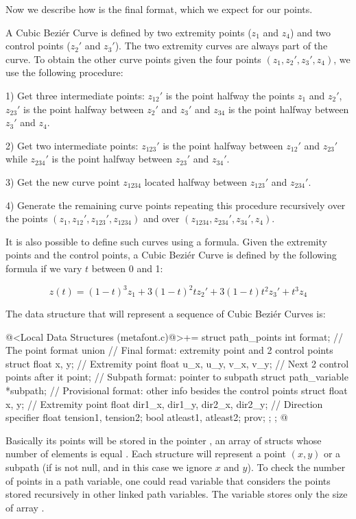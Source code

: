 Now we describe how is the final format, which we expect for our
points.

A Cubic Beziér Curve is defined by two extremity points ($z_1$ and
$z_4$) and two control points ($z_2'$ and $z_3'$). The two extremity
curves are always part of the curve. To obtain the other curve points
given the four points $(z_1, z_2', z_3', z_4)$, we use the following
procedure:

1) Get three intermediate points: $z_{12}'$ is the point halfway the
points $z_1$ and $z_2'$, $z_{23}'$ is the point halfway between $z_2'$
and $z_3'$ and $z_{34}$ is the point halfway between $z_3'$ and $z_4$.

2) Get two intermediate points: $z_{123}'$ is the point halfway
between $z_{12}'$ and $z_{23}'$ while $z_{234}'$ is the point halfway
between $z_{23}'$ and $z_{34}'$.

3) Get the new curve point $z_{1234}$ located halfway between
$z_{123}'$ and $z_{234}'$.

4) Generate the remaining curve points repeating this procedure
recursively over the points $(z_1, z_{12}', z_{123}', z_{1234})$ and
over $(z_{1234}, z_{234}', z_{34}', z_4)$.

It is also possible to define such curves using a formula. Given the
extremity points and the control points, a Cubic Beziér Curve is
defined by the following formula if we vary $t$ between 0 and 1:

$$
z(t) = (1-t)^3z_1 + 3(1-t)^2tz_2' + 3(1-t)t^2z_3'+t^3z_4
$$

The data structure that will represent a sequence of Cubic Beziér
Curves is:

\iniciocodigo
@<Local Data Structures (metafont.c)@>+=
struct path_points{
  int format; // The point format
  union{
    // Final format: extremity point and 2 control points
    struct{
      float x, y; // Extremity point
      float u_x, u_y, v_x, v_y;   // Next 2 control points after it
    } point;
    // Subpath format: pointer to subpath
    struct path_variable *subpath;
    // Provisional format: other info besides the control points
    struct{
      float x, y; // Extremity point
      float dir1_x, dir1_y, dir2_x, dir2_y; // Direction specifier
      float tension1, tension2;
      bool atleast1, atleast2;
    } prov;
  };
};
@
\fimcodigo

Basically its points will be stored in the
pointer , an array of structs whose number of
elements is equal . Each structure will represent a
point $(x, y)$ or a subpath (if  is not null, and
in this case we ignore $x$ and $y$). To check the number of points in
a path variable, one could read variable 
that considers the points stored recursively in other linked path
variables. The variable  stores only the size of
array .

